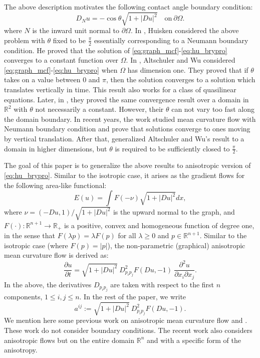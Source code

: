 \documentclass[12pt]{article}
\numberwithin{equation}{section}
\theoremstyle{plain}
\theoremstyle{definition}
\theoremstyle{remark}
\begin{document}
The above description motivates the following contact angle boundary condition:
\begin{equation} \label{eq:hu_brypro}
D_N u = -  \cos \theta \sqrt{1+|Du|^2}  \quad   \text{on} \ \partial \Omega.    
\end{equation}
where $N$ is the inward unit normal to $\partial\Omega$.
In \cite{Hu1}, Huisken considered the above problem
with $\theta$ fixed to be $\frac{\pi}{2}$ essentially corresponding to a Neumann boundary condition. He proved that the solution of \eqref{eq:graph_mcf}-\eqref{eq:hu_brypro} converges to a constant function over $\Omega$. In \cite{AW1}, Altschuler and Wu considered \eqref{eq:graph_mcf}-\eqref{eq:hu_brypro}
when $\Omega$ has dimension one. They proved that if $\theta$ takes on a value
between $0$ and $\pi$, then the solution converges to a solution which translates vertically in time. This result also works for a class of quasilinear equations. Later, in \cite{AW2}, they proved the same convergence result over a domain in $\mathbb{R}^{2}$ with $\theta$ not necessarily a constant. However, their $\theta$ can not vary too fast along the domain boundary. In recent years, the work \cite{MWW} studied mean curvature flow with Neumann boundary condition and prove that solutions converge to ones moving by vertical translation. After that, \cite{GMWW} generalized Altschuler and Wu's result to a domain in higher dimensions, but $\theta$ is required to be sufficiently closed to $\frac{\pi}{2}$. 

The goal of this paper is to generalize the above results to anisotropic version of
\eqref{eq:hu_brypro}.  Similar to the isotropic case, it arises as the
gradient flows for the following area-like functional:
\begin{equation} \label{eq:ani_funcl}
    E(u) = \int F(-\nu)\sqrt{1+|Du|^2} dx,
\end{equation}
where $\nu = (-Du,1)/\sqrt{1+|Du|^2}$ is the upward normal to the graph, and $F(\cdot): \mathbb{R}^{n+1}\longrightarrow\mathbb{R}_+$ is a positive, convex and homogeneous function of degree one, in the sense that $F(\lambda p) = \lambda F(p)$ for all $\lambda \geq 0$ and $p\in\mathbb{R}^{n+1}$. Similar to the isotropic case (where $F(p)=|p|$), the non-parametric (graphical) anisotropic mean curvature flow is derived as:
\begin{equation}  \label{eq:nonpara_aniso}
    \frac{\partial u}{\partial t} = \sqrt{1+|Du|^2} \ D^2_{p_i p_j} F (Du,-1) \ \frac{\partial^2 u}{\partial x_i \partial x_j}.
\end{equation}
In the above, the derivatives $D_{p_ip_j}$ are taken with respect to the first $n$ components, $1\leq i, j \leq n$. In the rest of the paper, we write
\begin{equation}\label{eq:def_a}
    a^{ij} := \sqrt{1+|Du|^2} \ D^2_{p_i p_j} F (Du,-1).
\end{equation}
We mention here some previous work on anisotropic mean curvature flow \cite{An1} and \cite{Cl}. These work do not consider boundary conditions. The recent work \cite{CKN} also considers anisotropic flows but on the entire domain $\mathbb{R}^n$ and with a specific form of the anisotropy.
\end{document}
